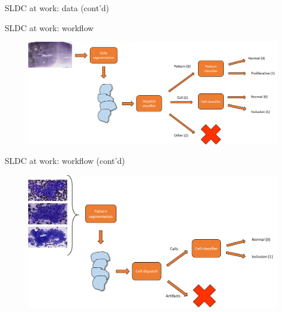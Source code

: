 \documentclass{beamer}
\begin{document}
\begin{frame}{SLDC at work: data (cont'd)}
\begin{figure}
		\hspace*{.5cm}
	\end{figure}
\end{frame}

\begin{frame}{SLDC at work: workflow}
	\begin{figure}
		\includegraphics[scale=0.35]{images/thyroid_workflow_1.png}
	\end{figure}
\end{frame}

\begin{frame}{SLDC at work: workflow (cont'd)}
	\begin{figure}
		\includegraphics[scale=0.4]{images/thyroid_workflow_2.png}
	\end{figure}
\end{frame}
\end{document}
